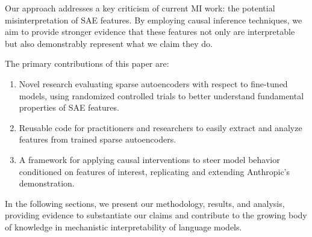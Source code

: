 Our approach addresses a key criticism of current MI work: the potential misinterpretation of SAE features. By employing causal inference techniques, we aim to provide stronger evidence that these features not only are interpretable but also demonstrably represent what we claim they do.

The primary contributions of this paper are:

\begin{enumerate}
    \item Novel research evaluating sparse autoencoders with respect to fine-tuned models, using randomized controlled trials to better understand fundamental properties of SAE features.
    \item Reusable code for practitioners and researchers to easily extract and analyze features from trained sparse autoencoders.
    \item A framework for applying causal interventions to steer model behavior conditioned on features of interest, replicating and extending Anthropic's demonstration.
\end{enumerate}

In the following sections, we present our methodology, results, and analysis, providing evidence to substantiate our claims and contribute to the growing body of knowledge in mechanistic interpretability of language models.